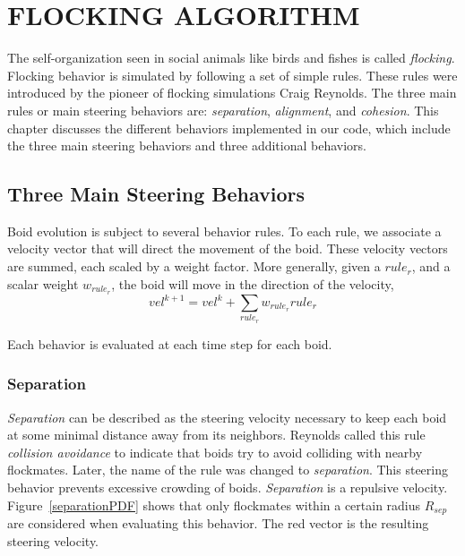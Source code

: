 \chapter{FLOCKING ALGORITHM}\label{chap3}

The self-organization seen in social animals like birds and fishes is called \textit{flocking}. Flocking behavior is simulated by following a set of simple rules. These rules were introduced by the pioneer of flocking simulations Craig Reynolds\cite{craig1}. The three main rules or main steering behaviors are: \textit{separation}, \textit{alignment}, and \textit{cohesion}. This chapter discusses the different behaviors implemented in our code, which include the three main steering behaviors and three additional behaviors.

\section{Three Main Steering Behaviors}
Boid evolution is subject to several behavior rules. To each rule, we associate a velocity vector that will direct the movement of the boid. These velocity vectors are summed, each scaled by a weight factor. More generally, given a $rule_r$, and a scalar weight $w_{rule_r}$, the boid will move in the direction of the velocity, 
\begin{equation}
vel^{k+1} = vel^{k} + \sum_{rule_r} w_{rule_r} {rule_r}
\end{equation}
	
Each behavior is evaluated at each time step for each boid.

\subsection{Separation}\label{separationsection}
\textit{Separation} can be described as the steering velocity necessary to keep each boid at some minimal distance away from its neighbors. Reynolds called this rule \textit{collision avoidance} to indicate that boids try to avoid colliding with nearby flockmates. Later, the name of the rule was changed to \textit{separation}. This steering behavior prevents excessive crowding of boids. \textit{Separation} is a repulsive velocity. Figure~\ref{separationPDF} shows that only flockmates within a certain radius $R_{sep}$ are considered when evaluating this behavior. The red vector is the resulting steering velocity.

